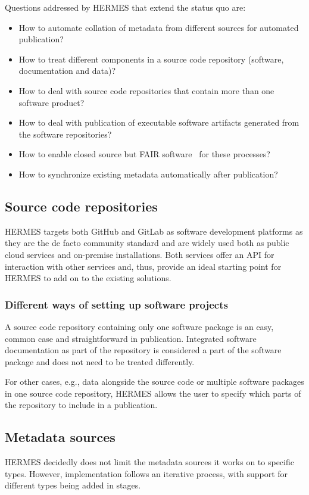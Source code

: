 \documentclass[11pt,a4paper]{scrartcl}
\begin{document}
Questions addressed by HERMES that extend the status quo are:

\begin{itemize}  
    \item How to automate collation of metadata from different sources for automated publication?
    \item How to treat different components in a source code repository (software, documentation and data)?
    \item How to deal with source code repositories that contain more than one software product?
    \item How to deal with publication of executable software artifacts generated from the software repositories?
    \item How to enable closed source but FAIR software~\cite{FAIR4RS-FreshLook} for these processes?
    \item How to synchronize existing metadata automatically after publication?
\end{itemize}


\subsection{Source code repositories}\label{subsec:concept-sourcerepos}
HERMES targets both GitHub and GitLab as software development platforms as they are the de facto community standard and are widely used
both as public cloud services and on-premise installations. Both services offer an API for interaction with other services and, thus,
provide an ideal starting point for HERMES to add on to the existing solutions.

\subsubsection{Different ways of setting up software projects}\label{subsubsec:concept-sourcerepos-ways}
A source code repository containing only one software package is an easy, common case and straightforward in publication. Integrated
software documentation as part of the repository is considered a part of the software package and does not need to be treated differently.

For other cases, e.g., data alongside the source code or multiple software packages in one source code repository, HERMES allows the user to specify which parts of the repository to include in a publication.



\subsection{Metadata sources}\label{subsec:concept-metadata-sources}
HERMES decidedly does not limit the metadata sources it works on to specific types. However, implementation follows an iterative
process, with support for different types being added in stages.
\end{document}
